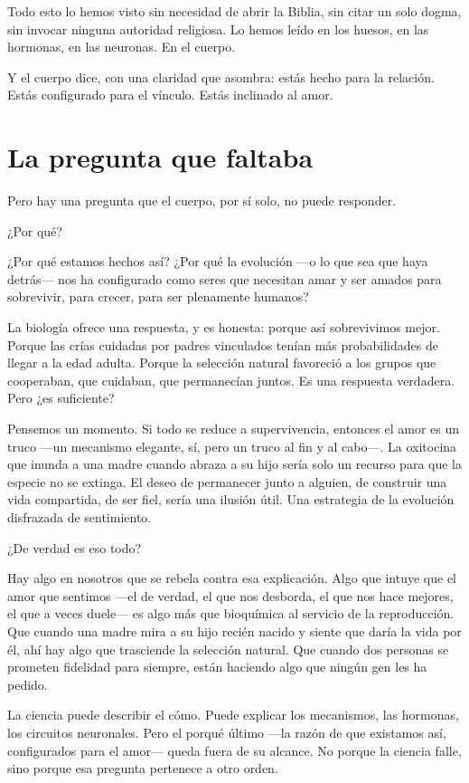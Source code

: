 Todo esto lo hemos visto sin necesidad de abrir la Biblia, sin citar un solo dogma, sin invocar ninguna autoridad religiosa. Lo hemos leído en los huesos, en las hormonas, en las neuronas. En el cuerpo.

Y el cuerpo dice, con una claridad que asombra: estás hecho para la relación. Estás configurado para el vínculo. Estás inclinado al amor.

\section{La pregunta que faltaba}

Pero hay una pregunta que el cuerpo, por sí solo, no puede responder.

¿Por qué?

¿Por qué estamos hechos así? ¿Por qué la evolución ---o lo que sea que haya detrás--- nos ha configurado como seres que necesitan amar y ser amados para sobrevivir, para crecer, para ser plenamente humanos?

La biología ofrece una respuesta, y es honesta: porque así sobrevivimos mejor. Porque las crías cuidadas por padres vinculados tenían más probabilidades de llegar a la edad adulta. Porque la selección natural favoreció a los grupos que cooperaban, que cuidaban, que permanecían juntos. Es una respuesta verdadera. Pero ¿es suficiente?

Pensemos un momento. Si todo se reduce a supervivencia, entonces el amor es un truco ---un mecanismo elegante, sí, pero un truco al fin y al cabo---. La oxitocina que inunda a una madre cuando abraza a su hijo sería solo un recurso para que la especie no se extinga. El deseo de permanecer junto a alguien, de construir una vida compartida, de ser fiel, sería una ilusión útil. Una estrategia de la evolución disfrazada de sentimiento.

¿De verdad es eso todo?

Hay algo en nosotros que se rebela contra esa explicación. Algo que intuye que el amor que sentimos ---el de verdad, el que nos desborda, el que nos hace mejores, el que a veces duele--- es algo más que bioquímica al servicio de la reproducción. Que cuando una madre mira a su hijo recién nacido y siente que daría la vida por él, ahí hay algo que trasciende la selección natural. Que cuando dos personas se prometen fidelidad para siempre, están haciendo algo que ningún gen les ha pedido.

La ciencia puede describir el cómo. Puede explicar los mecanismos, las hormonas, los circuitos neuronales. Pero el porqué último ---la razón de que existamos así, configurados para el amor--- queda fuera de su alcance. No porque la ciencia falle, sino porque esa pregunta pertenece a otro orden.

